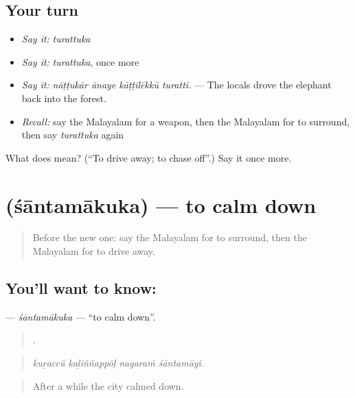 \subsection*{Your turn}
\begin{itemize}
\raggedright
  \item \emph{Say it:} \emph{turattuka}
  \item \emph{Say it:} \emph{turattuka}, once more
  \item \emph{Say it:} \emph{nāṭṭukār ānaye kāṭṭilēkkŭ turatti.} — The locals drove the elephant back into the forest.
  \item \emph{Recall:} say the Malayalam for a weapon, then the Malayalam for to surround, then say \emph{turattuka} again
\end{itemize}

\begin{tcolorbox}[breakable,colback=teal!4,colframe=teal!35!black,title={Before you move on}]
What does  mean? (\textquotedblleft{}To drive away; to chase off\textquotedblright{}.) Say it once more.
\end{tcolorbox}
\section[\texorpdfstring{\ml{ശാന്തമാകുക} (śāntamākuka)}{ശാന്തമാകുക (śāntamākuka)}]{ (śāntamākuka) — to calm down}

\label{lesson:ML-C382-santamakuka}



\begin{quote}
Before the new one: say the Malayalam for to surround, then the Malayalam for to drive away.
\end{quote}

\subsection*{You'll want to know: }
\textbf{} — \emph{śāntamākuka} — \textquotedblleft{}to calm down\textquotedblright{}.

\begin{quote}
   .
\end{quote}

\begin{quote}
\emph{kuṟaccŭ kaḻiññappōḷ nagaraṁ śāntamāyi.}
\end{quote}

\begin{quote}
After a while the city calmed down.
\end{quote}

